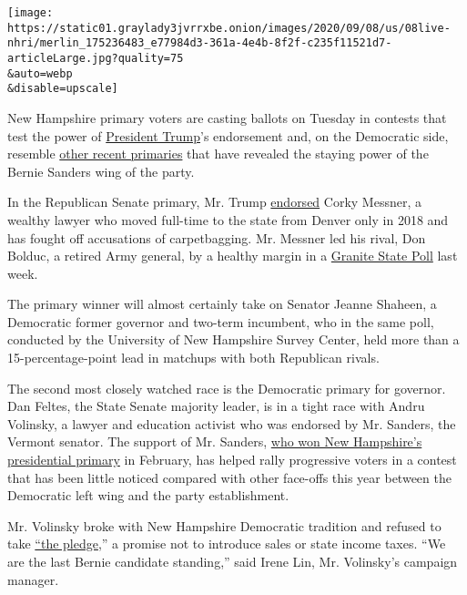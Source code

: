 \texttt{[image: https://static01.graylady3jvrrxbe.onion/images/2020/09/08/us/08live-nhri/merlin\_175236483\_e77984d3-361a-4e4b-8f2f-c235f11521d7-articleLarge.jpg?quality=75\\\&auto=webp\\\&disable=upscale]}

New Hampshire primary voters are casting ballots on Tuesday in contests
that test the power of
\href{https://www.nytimes3xbfgragh.onion/interactive/2020/us/elections/donald-trump.html}{President
Trump}'s endorsement and, on the Democratic side, resemble
\href{https://www.nytimes3xbfgragh.onion/2020/08/05/us/politics/election-primary-results.html}{other
recent primaries} that have revealed the staying power of the Bernie
Sanders wing of the party.

In the Republican Senate primary, Mr. Trump
\href{https://twitter.com/realDonaldTrump/status/1271482304716845057}{endorsed}
Corky Messner, a wealthy lawyer who moved full-time to the state from
Denver only in 2018 and has fought off accusations of carpetbagging. Mr.
Messner led his rival, Don Bolduc, a retired Army general, by a healthy
margin in a
\href{https://scholars.unh.edu/survey_center_polls/606/}{Granite State
Poll} last week.

The primary winner will almost certainly take on Senator Jeanne Shaheen,
a Democratic former governor and two-term incumbent, who in the same
poll, conducted by the University of New Hampshire Survey Center, held
more than a 15-percentage-point lead in matchups with both Republican
rivals.

The second most closely watched race is the Democratic primary for
governor. Dan Feltes, the State Senate majority leader, is in a tight
race with Andru Volinsky, a lawyer and education activist who was
endorsed by Mr. Sanders, the Vermont senator. The support of Mr.
Sanders,
\href{https://www.nytimes3xbfgragh.onion/2020/02/11/us/politics/bernie-sanders-new-hampshire-primary.html}{who
won New Hampshire's presidential primary} in February, has helped rally
progressive voters in a contest that has been little noticed compared
with other face-offs this year between the Democratic left wing and the
party establishment.

Mr. Volinsky broke with New Hampshire Democratic tradition and refused
to take
\href{https://www.nhpr.org/post/nh-democrats-running-office-political-pull-pledge-remains-strong\#stream/0}{``the
pledge},'' a promise not to introduce sales or state income taxes. ``We
are the last Bernie candidate standing,'' said Irene Lin, Mr. Volinsky's
campaign manager.

